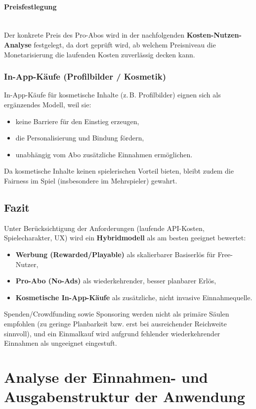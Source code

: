 \paragraph{Preisfestlegung}
\mbox{}\\
Der konkrete Preis des Pro-Abos wird in der nachfolgenden \textbf{Kosten-Nutzen-Analyse} festgelegt, da dort geprüft wird, ab welchem Preisniveau die Monetarisierung die laufenden Kosten zuverlässig decken kann.

\subsubsection{In-App-Käufe (Profilbilder / Kosmetik)}
In-App-Käufe für kosmetische Inhalte (z.\,B. Profilbilder) eignen sich als ergänzendes Modell, weil sie:
\begin{itemize}
    \item keine Barriere für den Einstieg erzeugen,
    \item die Personalisierung und Bindung fördern,
    \item unabhängig vom Abo zusätzliche Einnahmen ermöglichen.
\end{itemize}
Da kosmetische Inhalte keinen spielerischen Vorteil bieten, bleibt zudem die Fairness im Spiel (insbesondere im Mehrspieler) gewahrt.

\subsection{Fazit}
Unter Berücksichtigung der Anforderungen (laufende API-Kosten, Spielecharakter, UX) wird ein \textbf{Hybridmodell} als am besten geeignet bewertet:
\begin{itemize}
    \item \textbf{Werbung (Rewarded/Playable)} als skalierbarer Basiserlös für Free-Nutzer,
    \item \textbf{Pro-Abo (No-Ads)} als wiederkehrender, besser planbarer Erlös,
    \item \textbf{Kosmetische In-App-Käufe} als zusätzliche, nicht invasive Einnahmequelle.
\end{itemize}
Spenden/Crowdfunding sowie Sponsoring werden nicht als primäre Säulen empfohlen (zu geringe Planbarkeit bzw. erst bei ausreichender Reichweite sinnvoll), und ein Einmalkauf wird aufgrund fehlender wiederkehrender Einnahmen als ungeeignet eingestuft.

\section{Analyse der Einnahmen- und Ausgabenstruktur der Anwendung}

